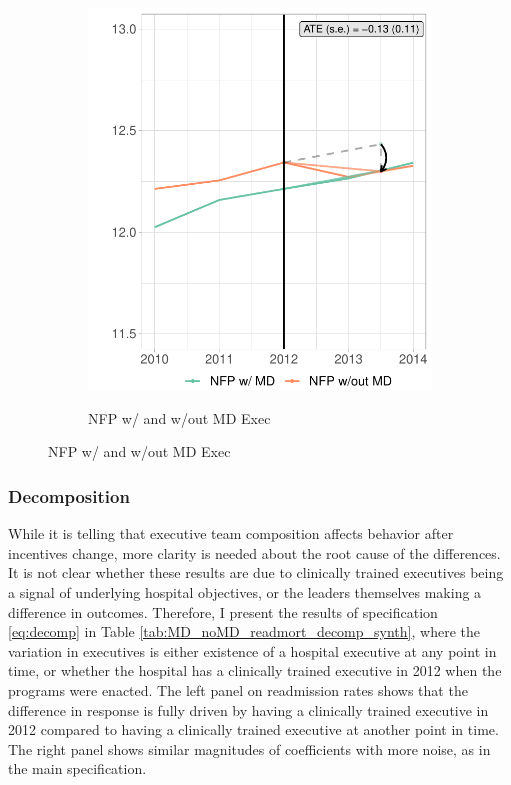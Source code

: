 \documentclass[12pt]{article}
\begin{document}
\begin{figure}
\begin{subfigure}[b]{0.45\textwidth}
         \label{fig:mort_synth_plotc}
     \end{subfigure}
     \hfill
     \begin{subfigure}[b]{0.45\textwidth}
         \centering
         \caption{NFP w/ and w/out MD Exec}
         \includegraphics[width=\textwidth]{Objects/mort_md_nomd_synth_graph.pdf}
         \label{fig:mort_synth_plotd}
     \end{subfigure}
        \label{fig:mort_synth_plot}
    \end{figure}

    \subsubsection{Decomposition}

    While it is telling that executive team composition affects behavior after incentives change, more clarity is needed about the root cause of the differences. It is not clear whether these results are due to clinically trained executives being a signal of underlying hospital objectives, or the leaders themselves making a difference in outcomes. Therefore, I present the results of specification \ref{eq:decomp} in Table \ref{tab:MD_noMD_readmort_decomp_synth}, where the variation in executives is either existence of a hospital executive at any point in time, or whether the hospital has a clinically trained executive in 2012 when the programs were enacted. The left panel on readmission rates shows that the difference in response is fully driven by having a clinically trained executive in 2012 compared to having a clinically trained executive at another point in time. The right panel shows similar magnitudes of coefficients with more noise, as in the main specification.  
\end{document}

